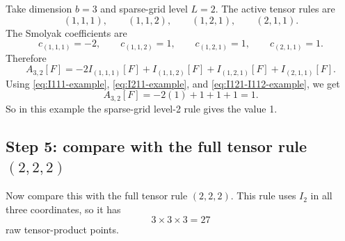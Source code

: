 \documentclass[11pt]{article}
\begin{document}
Take dimension \(b=3\) and sparse-grid level \(L=2\).  The active tensor rules
are
\begin{equation}
  (1,1,1),\qquad (1,1,2),\qquad (1,2,1),\qquad (2,1,1).
  \label{eq:3d-active-rules-full-example}
\end{equation}
The Smolyak coefficients are
\begin{equation}
  c_{(1,1,1)}=-2,
  \qquad
  c_{(1,1,2)}=1,
  \qquad
  c_{(1,2,1)}=1,
  \qquad
  c_{(2,1,1)}=1.
  \label{eq:3d-smolyak-coeffs-example}
\end{equation}
Therefore
\begin{equation}
  A_{3,2}[F]
  =
  -2I_{(1,1,1)}[F]+I_{(1,1,2)}[F]+I_{(1,2,1)}[F]+I_{(2,1,1)}[F].
  \label{eq:A32-example}
\end{equation}
Using \eqref{eq:I111-example}, \eqref{eq:I211-example}, and
\eqref{eq:I121-I112-example}, we get
\begin{equation}
  A_{3,2}[F]
  =
  -2(1)+1+1+1=1.
  \label{eq:A32-example-value}
\end{equation}
So in this example the sparse-grid level-2 rule gives the value 1.

\subsection{Step 5: compare with the full tensor rule \texorpdfstring{\((2,2,2)\)}{(2,2,2)}}

Now compare this with the full tensor rule \((2,2,2)\).  This rule uses \(I_2\)
in all three coordinates, so it has
\begin{equation}
  3\times 3\times 3=27
  \label{eq:27-point-count}
\end{equation}
raw tensor-product points.
\end{document}
